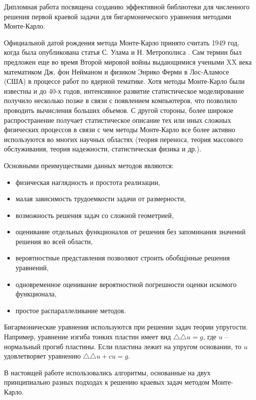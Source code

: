 \newpage{}

Дипломная работа посвящена созданию эффективной библиотеки для численного решения первой краевой задачи для бигармонического уравнения методами Монте-Карло. 

Официальной датой рождения метода Монте-Карло принято считать 1949 год, когда была опубликована статья С. Улама и Н. Метрополиса \cite{int:fist} . Сам термин был предложен еще во время Второй мировой войны выдающимися учеными XX века математиком Дж. фон Нейманом и физиком Энрико Ферми в Лос-Аламосе (США) в процессе работ по ядерной тематике. Хотя методы Монте-Карло были известны и до 40-х годов, интенсивное развитие статистическое моделирование получило несколько позже в связи с появлением компьютеров, что позволило проводить вычисления больших объемов. С другой стороны, более широкое распространение получает статистическое описание тех или иных сложных физических процессов в связи с чем методы Монте-Карло все более активно используются во многих научных областях (теория переноса, теория массового обслуживания, теория надежности, статистическая физика и др.).

Основными преимуществами данных методов являются:

\begin{itemize}
	\item физическая наглядность и простота реализации,
	\item малая зависимость трудоемкости задачи от размерности,
	\item возможность решения задач со сложной геометрией,
	\item оценивание отдельных функционалов от решения без запоминания значений решения во всей области,
	\item вероятностные представления позволяют строить обобщјнные решения уравнений,
	\item одновременное оценивание вероятностной погрешности оценки искомого функционала,
	\item простое распараллеливание методов.
\end{itemize}

Бигармонические уравнения используются при решении задач теории упругости. Например, уравнение
изгиба тонких пластин имеет вид $\triangle\triangle u = g$, где $u$ --
нормальный прогиб пластины. Если пластина лежит на упругом
основании, то $u$ удовлетворяет уравнению $\triangle\triangle u
+cu=g$.

В настоящей работе использовались алгоритмы, основанные на двух принципиально разных подходах к решению краевых задач методом Монте-Карло.

